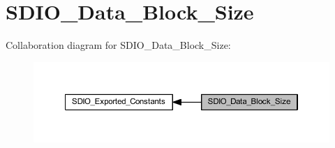 \hypertarget{group___s_d_i_o___data___block___size}{}\section{S\+D\+I\+O\+\_\+\+Data\+\_\+\+Block\+\_\+\+Size}
\label{group___s_d_i_o___data___block___size}
Collaboration diagram for S\+D\+I\+O\+\_\+\+Data\+\_\+\+Block\+\_\+\+Size\+:
\nopagebreak
\begin{figure}[H]
\begin{center}
\leavevmode
\includegraphics[width=350pt]{group___s_d_i_o___data___block___size}
\end{center}
\end{figure}
